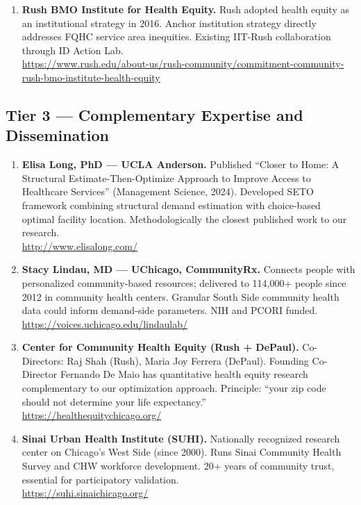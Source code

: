 \documentclass[11pt]{article}
\begin{document}
\begin{enumerate}
\item \textbf{Rush BMO Institute for Health Equity.}
Rush adopted health equity as an institutional strategy in 2016. Anchor institution strategy directly addresses FQHC service area inequities. Existing IIT-Rush collaboration through ID Action Lab. \\
\url{https://www.rush.edu/about-us/rush-community/commitment-community-rush-bmo-institute-health-equity}

\end{enumerate}

\subsection*{Tier 3 — Complementary Expertise and Dissemination}

\begin{enumerate}

\item \textbf{Elisa Long, PhD — UCLA Anderson.}
Published ``Closer to Home: A Structural Estimate-Then-Optimize Approach to Improve Access to Healthcare Services'' (Management Science, 2024). Developed SETO framework combining structural demand estimation with choice-based optimal facility location. Methodologically the closest published work to our research. \\
\url{http://www.elisalong.com/}

\item \textbf{Stacy Lindau, MD — UChicago, CommunityRx.}
Connects people with personalized community-based resources; delivered to 114,000+ people since 2012 in community health centers. Granular South Side community health data could inform demand-side parameters. NIH and PCORI funded. \\
\url{https://voices.uchicago.edu/lindaulab/}

\item \textbf{Center for Community Health Equity (Rush + DePaul).}
Co-Directors: Raj Shah (Rush), Maria Joy Ferrera (DePaul). Founding Co-Director Fernando De Maio has quantitative health equity research complementary to our optimization approach. Principle: ``your zip code should not determine your life expectancy.'' \\
\url{https://healthequitychicago.org/}

\item \textbf{Sinai Urban Health Institute (SUHI).}
Nationally recognized research center on Chicago's West Side (since 2000). Runs Sinai Community Health Survey and CHW workforce development. 20+ years of community trust, essential for participatory validation. \\
\url{https://suhi.sinaichicago.org/}


\end{enumerate}
\end{document}
